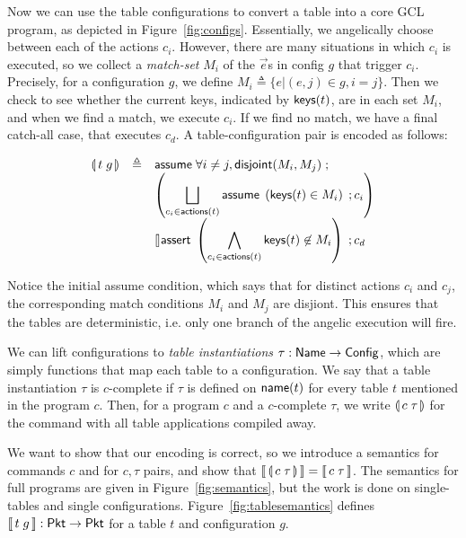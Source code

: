 Now we can use the table configurations to convert a table into a core GCL
program, as depicted in Figure~\ref{fig:configs}. Essentially, we angelically
choose between each of the actions $c_i$. However, there are many situations in
which $c_i$ is executed, so we collect a \emph{match-set} $M_i$ of the $\vec e$s
in config $g$ that trigger $c_i$. Precisely, for a configuration $g$, we define
$M_i \triangleq \{ e | (e,j) \in g, i = j\}$. Then we check to see whether the
current keys, indicated by $\mathsf{keys}(t)$, are in each set $M_i$, and when we find a
match, we execute $c_i$. If we find no match, we have a final catch-all case,
that executes $c_d$. A table-configuration pair is encoded as follows:

\[ \begin{array}{lcl}
     \llparenthesis\, t\; g\, \rrparenthesis
     & \triangleq
     & \mathsf{assume}\; \forall i\neq j, \mathsf{disjoint}(M_i,M_j)\;; \\
     &&\left( \displaystyle \bigsqcup_{c_i \in \mathsf{actions}(t)}
        \mathsf{assume}\; \left(\mathsf{keys}(t) \in M_i\right)\;; c_i\right)\\
     && \displaystyle \talloblong \mathsf{assert}\; \left(\bigwedge_{c_i \in \mathsf{actions}(t)} \mathsf{keys}(t) \not\in M_i\right)\;; c_d
   \end{array}
\]

Notice the initial assume condition, which says that for distinct actions $c_i$
and $c_j$, the corresponding match conditions $M_i$ and $M_j$ are disjiont. This
ensures that the tables are deterministic, i.e. only one branch of the angelic
execution will fire.

We can lift configurations to \emph{table instantiations}
$\tau : \mathsf{Name} \to \mathsf{Config}$, which are simply functions that map each table to a
configuration. We say that a table instantiation $\tau$ is $c$-complete if
$\tau$ is defined on $\mathsf{name}(t)$ for every table $t$ mentioned in the program
$c$. Then, for a program $c$ and a $c$-complete $\tau$, we write
$\llparenthesis\, c\; \tau\, \rrparenthesis$ for the command with all table applications compiled away.

We want to show that our encoding is correct, so we introduce a semantics for
commands $c$ and for $c,\tau$ pairs, and show that
$\llbracket\,\llparenthesis\, c\; \tau\, \rrparenthesis\,\rrbracket = \llbracket\,c\; \tau\,\rrbracket$. The semantics for full
programs are given in Figure~\ref{fig:semantics}, but the work is done on
single-tables and single configurations. Figure~\ref{fig:tablesemantics} defines
$\llbracket\,t\; g\,\rrbracket : \mathsf{Pkt} \to \mathsf{Pkt}$ for a table $t$ and configuration $g$.

